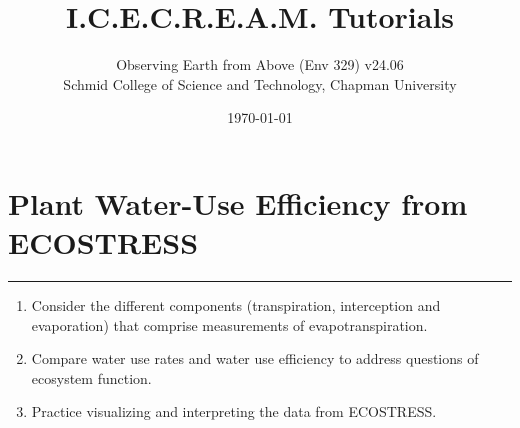 \documentclass[oneside,a4paper,11pt,explicit]{book}
\title{I.C.E.C.R.E.A.M. Tutorials}
\subtitle{\small Observing Earth from Above (Env 329) v24.06 \\
	\small Schmid College of Science and Technology, Chapman University}
\date{\today}
\begin{document}
\dominitoc

\faketableofcontents

\setcounter{chapter}{8} %

\chapter{Plant Water-Use Efficiency from ECOSTRESS} %

\vspace{-2em}

\minitoc

\hrule

\vspace{1em}

\begin{tcolorbox}[enhanced,frame style image=blueshade.png,
	opacityback=0.75,opacitybacktitle=0.25,
	colback=blue!5!white,colframe=blue!75!black,title={\Large \textbf{Objectives:}}]
	\large
	\begin{enumerate}
		\item Consider the different components (transpiration, interception and evaporation) that comprise measurements of evapotranspiration.
		\item Compare water use rates and water use efficiency to address questions of ecosystem function.
        \item Practice visualizing and interpreting the data from ECOSTRESS. 
	\end{enumerate}
\end{tcolorbox}

\clearpage
\end{document}
